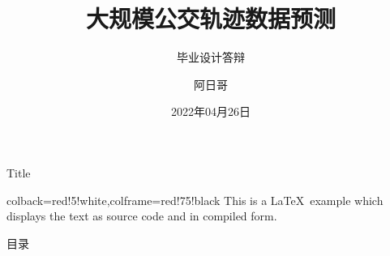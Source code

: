 \documentclass[aspectratio=169]{beamer}
\author{阿日哥}
\title{大规模公交轨迹数据预测}
\subtitle{毕业设计答辩}
\institute{武汉大学计算机学院}
\date{2022年04月26日}
\begin{document}
\kaishu
\begin{frame}
    \titlepage
    
\end{frame}

\begin{frame}[fragile]{Title}
    \begin{tcblisting}{colback=red!5!white,colframe=red!75!black}
        This is a \LaTeX\ example which displays the text as source code
        and in compiled form.
    \end{tcblisting}
\end{frame}

\begin{frame}{目录}
                
        \transfade %
        \tableofcontents
\end{frame}









\end{document}
